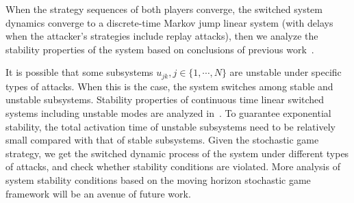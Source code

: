 \iffalse
\begin{proposition}
If the control input $\gamma(a_{ik}, u_{jk})=L_j\hat{\mathbf{x}}_{t}, t\in[k-T, k]$ for any action pair $(a_{ik}, u_{jk})$, then the system is not asymptotically stable when the strategy sequences $\mathbf{f}_k^*(s_{kl})$, $\mathbf{g}_k^*(s_{kl})$ of the stochastic game are not convergent.
\end{proposition}

Sketch of the proof: 
When the system is asymptotically stable, $\lim_{k\to\infty}\mathbf{Ex}_k=0$, by the definition of immediate payoff function~\eqref{payoff}, we gave $$
After calculating the strategies at stage $k$, the next step of the Algorithm~\ref{finite_new} is updating the system dynamics, and then getting the auxiliary matrices $Q_{k}(s_{(k+1)l}),l=1,2,3$ for stage $k+1$. 
\fi
\begin{remark}
When the strategy sequences of both players converge, the switched system dynamics converge to a discrete-time Markov jump linear system (with delays when the attacker's strategies include replay attacks), then we analyze the stability properties of the system based on conclusions of previous work~\cite{delay_mlj}.
\end{remark}

It is possible that some subsystems $u_{jk}, j \in \{1,\cdots, N\}$  are unstable under specific types of attacks.
When this is the case, the system switches among stable and unstable subsystems. Stability properties of continuous time linear switched systems including unstable modes are analyzed in~\cite{switch_unstable}. To guarantee exponential stability, the total activation time of unstable subsystems need to be relatively small compared with that of stable subsystems. Given the stochastic game strategy, we get the switched dynamic process of the system under different types of attacks, and check whether stability conditions are violated. 
More analysis of system stability conditions based on the moving horizon stochastic game framework will be an avenue of future work.
\iffalse the system is still Markov jump, and properties of piecewise homogeneous Markov jump systems are discussed in~\cite{H_mj}. \fi


